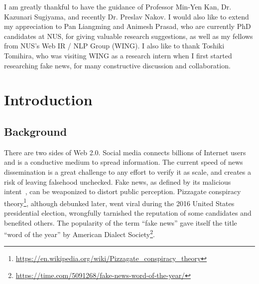 \documentclass[fyp]{socreport}
\theoremstyle{definition}
\theoremstyle{hypothesis}
\begin{document}
\begin{acknowledgement}
I am greatly thankful to have the guidance of Professor Min-Yen Kan, Dr. Kazunari Sugiyama, and recently Dr. Preslav Nakov. I would also like to extend my appreciation to Pan Liangming and Animesh Prasad, who are currently PhD candidates at NUS, for giving valuable research suggestions, as well as my fellows from NUS's Web IR / NLP Group (WING). I also like to thank Toshiki Tomihira, who was visiting WING as a research intern when I first started researching fake news, for many constructive discussion and collaboration.
\end{acknowledgement}

\listoffigures 
\listoftables
\tableofcontents 

\chapter{Introduction}
\label{ch:introduction}
\section{Background}
There are two sides of Web 2.0. Social media connects billions of Internet users and is a conductive medium to spread information. The current speed of news dissemination is a great challenge to any effort to verify it as scale, and creates a risk of leaving falsehood unchecked. Fake news, as defined by its malicious intent~\cite{shu2017fake}, can be weaponized to distort public perception. Pizzagate conspiracy theory\footnote{\scriptsize{\url{https://en.wikipedia.org/wiki/Pizzagate_conspiracy_theory}}}, although debunked later, went viral during the 2016 United States presidential election, wrongfully tarnished the reputation of some candidates and benefited others. 
The popularity of the term ``fake news'' gave itself the title ``word of the year'' by American Dialect Society\footnote{\scriptsize{\url{https://time.com/5091268/fake-news-word-of-the-year/}}}.
\end{document}

